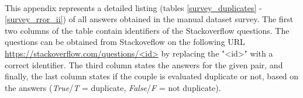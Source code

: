 \paragraph{}
This appendix represents a detailed listing (tables \ref{survey_duplicates} - \ref{survey_rror_ii}) of all answers obtained in the manual dataset survey. The first two columns of the table contain identifiers of the Stackoverflow questions. The questions can be obtained from Stackoveflow on the following URL \url{https://stackoverflow.com/questions/<id>} by replacing the "<id>" with  a correct identifier. The third column states the answers  for the given pair, and finally, the last column states if the couple  is evaluated duplicate or not, based on the answers (\textit{True}/\textit{T} = duplicate, \textit{False}/\textit{F} = not duplicate).

